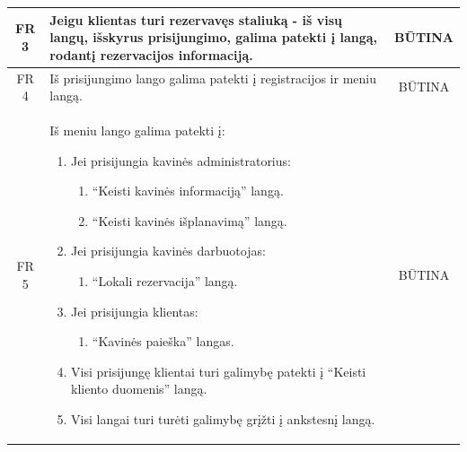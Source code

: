 \documentclass{VUMIFPSkursinis}
\begin{document}
\begin{center}
\begin{table}[H]
\begin{tabular}{|p{2cm}|p{}|p{}|}
		\multicolumn{1}{|c|}{FR 3}&
		{Jeigu klientas turi rezervavęs staliuką - iš visų langų, išskyrus \newline prisijungimo, galima patekti į langą, rodantį rezervacijos informaciją.}&
		\multicolumn{1}{|c|}{BŪTINA}\\
	\hline
		\multicolumn{1}{|c|}{FR 4}&
		{Iš prisijungimo lango galima patekti į registracijos ir meniu langą.}&
		\multicolumn{1}{|c|}{BŪTINA}\\
	\hline
		\multicolumn{1}{|c|}{FR 5}&
		{Iš meniu lango galima patekti į:\newline
		\begin{enumerate}
			\item Jei prisijungia kavinės administratorius:
				\begin{enumerate}
					\item “Keisti kavinės informaciją” langą.
					\item “Keisti kavinės išplanavimą” langą.
				\end{enumerate}
			\item Jei prisijungia kavinės darbuotojas:
				\begin{enumerate}
					\item “Lokali rezervacija” langą.
				\end{enumerate}
			\item Jei prisijungia klientas:
				\begin{enumerate}
					\item “Kavinės paieška” langas.
				\end{enumerate}
			\item Visi prisijungę klientai turi galimybę patekti į “Keisti kliento duomenis” langą.
			\item Visi langai turi turėti galimybę grįžti į ankstesnį langą.
		\end{enumerate}
		}&
		\multicolumn{1}{|c|}{BŪTINA}\\		
	\hline
	
	\end{tabular}
	
	\label{table:AplikacijosLangai}
	\end{table}
	
\end{center}

\pagebreak
\end{document}
